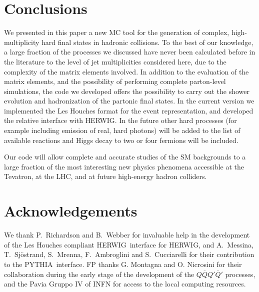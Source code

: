 \documentclass[paper]{JHEP3}
\def    \Qbar   {\overline{Q}}
\def\herwig{{\small HERWIG}}
\def\pythia{{\small PYTHIA}}
\begin{document}
\section{Conclusions}
\label{sec:concl}
We presented in this paper a new MC tool for the generation of
complex, high-multiplicity hard final states in hadronic collisions.
To the best of our knowledge, a large fraction of the processes we
discussed have never been calculated before in the literature to the
level of jet multiplicities considered here, due to the complexity of
the matrix elements involved. In addition to the evaluation of the
matrix elements, and the possibility of performing complete
parton-level simulations, the code we developed offers the possibility
to carry out the shower evolution and hadronization of the partonic
final states. In the current version we implemented the Les Houches
format for the event representation, and developed the relative
interface with \herwig.  In the future other hard processes (for
example including emission of real, hard photons) will be added to the
list of available reactions and Higgs decay to two or four fermions
will be included.

Our code will allow complete and accurate studies of the SM
backgrounds to a large fraction of the most interesting new physics
phenomena accessible at the Tevatron, at the LHC, and at future
high-energy hadron colliders.

\section*{Acknowledgements}
We thank P.~Richardson and B.~Webber for invaluable help in the
development of the Les Houches compliant \herwig\ interface for
\herwig, and A.~Messina, T.~Sj\"ostrand, S.~Mrenna, F.~Ambroglini and
S.~Cucciarelli for their contribution to the \pythia\ interface.
FP thanks G. Montagna and O. Nicrosini for their collaboration during
the early stage of the development of the $Q\Qbar Q'\Qbar'$ processes,
and the Pavia Gruppo IV of INFN for access to the local computing resources.
\end{document}
